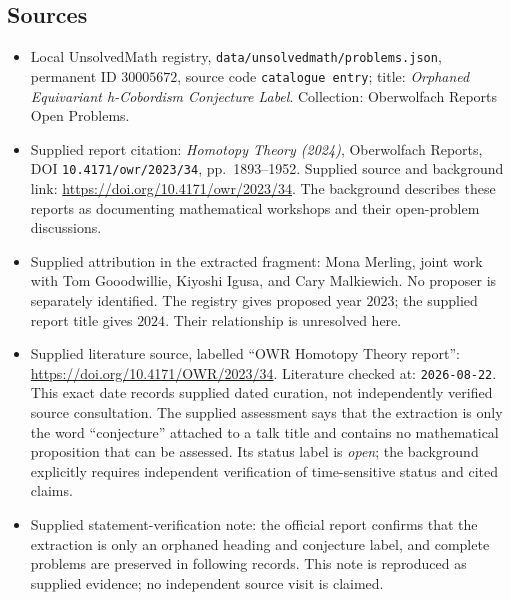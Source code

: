 \documentclass[11pt]{article}
\begin{document}
\subsection{Sources}
\begin{itemize}
\item Local UnsolvedMath registry, \texttt{data/unsolvedmath/problems.json}, permanent ID \(30005672\), source code \texttt{catalogue entry}; title: \emph{Orphaned Equivariant h-Cobordism Conjecture Label}. Collection: Oberwolfach Reports Open Problems.
\item Supplied report citation: \emph{Homotopy Theory (2024)}, Oberwolfach Reports, DOI \texttt{10.4171/owr/2023/34}, pp.~1893--1952. Supplied source and background link: \url{https://doi.org/10.4171/owr/2023/34}. The background describes these reports as documenting mathematical workshops and their open-problem discussions.
\item Supplied attribution in the extracted fragment: Mona Merling, joint work with Tom Gooodwillie, Kiyoshi Igusa, and Cary Malkiewich. No proposer is separately identified. The registry gives proposed year \(2023\); the supplied report title gives \(2024\). Their relationship is unresolved here.
\item Supplied literature source, labelled ``OWR Homotopy Theory report'': \url{https://doi.org/10.4171/OWR/2023/34}. Literature checked at: \texttt{2026-08-22}. This exact date records supplied dated curation, not independently verified source consultation. The supplied assessment says that the extraction is only the word ``conjecture'' attached to a talk title and contains no mathematical proposition that can be assessed. Its status label is \emph{open}; the background explicitly requires independent verification of time-sensitive status and cited claims.
\item Supplied statement-verification note: the official report confirms that the extraction is only an orphaned heading and conjecture label, and complete problems are preserved in following records. This note is reproduced as supplied evidence; no independent source visit is claimed.
\end{itemize}
\end{document}
